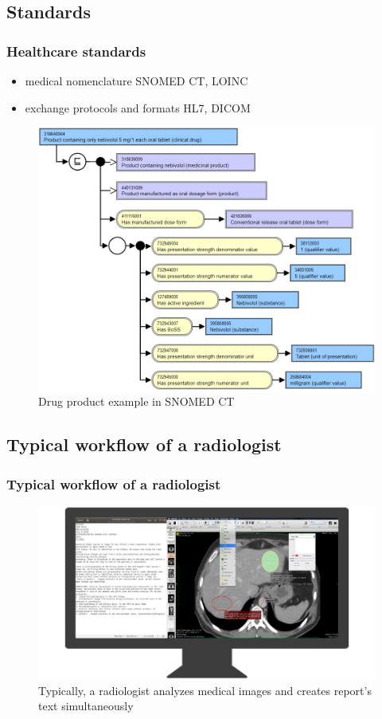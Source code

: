 \documentclass{beamer}
\begin{document}
\subsection{Standards}
\begin{frame}
\frametitle{Healthcare standards}
\begin{itemize}
	\item medical nomenclature SNOMED CT, LOINC
	\item exchange protocols and formats HL7, DICOM
\end{itemize}
\begin{figure}
	\centering
	\includegraphics[width=0.7\linewidth]{../snomed}
	\caption{Drug product example in SNOMED CT}
	\label{fig:snomed}
\end{figure}

\end{frame}

\subsection{Typical workflow of a radiologist}
\begin{frame}
\frametitle{Typical workflow of a radiologist}
\begin{figure}
	\centering
	\includegraphics[width=1\linewidth]{../workspace}
	\caption{Typically, a radiologist analyzes medical images and creates report's text simultaneously}
	\label{fig:workspace}
\end{figure}
\end{frame}
\end{document}
